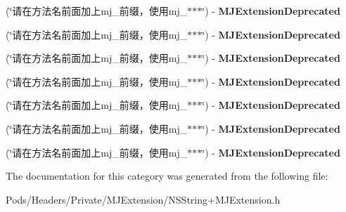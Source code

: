 \begin{DoxyCompactItemize}
(\char`\"{}请在方法名前面加上mj\+\_\+前缀，使用mj\+\_\+$\ast$$\ast$$\ast$\char`\"{}) -\/ {\bfseries M\+J\+Extension\+Deprecated}
\item 
\mbox{\label{category_n_s_string_07_m_j_extension_deprecated__v__2__5__16_08_ab08e53dd4b8481f26934085e7ff40d45}} 
(\char`\"{}请在方法名前面加上mj\+\_\+前缀，使用mj\+\_\+$\ast$$\ast$$\ast$\char`\"{}) -\/ {\bfseries M\+J\+Extension\+Deprecated}
\item 
\mbox{\label{category_n_s_string_07_m_j_extension_deprecated__v__2__5__16_08_ab08e53dd4b8481f26934085e7ff40d45}} 
(\char`\"{}请在方法名前面加上mj\+\_\+前缀，使用mj\+\_\+$\ast$$\ast$$\ast$\char`\"{}) -\/ {\bfseries M\+J\+Extension\+Deprecated}
\item 
\mbox{\label{category_n_s_string_07_m_j_extension_deprecated__v__2__5__16_08_ab08e53dd4b8481f26934085e7ff40d45}} 
(\char`\"{}请在方法名前面加上mj\+\_\+前缀，使用mj\+\_\+$\ast$$\ast$$\ast$\char`\"{}) -\/ {\bfseries M\+J\+Extension\+Deprecated}
\item 
\mbox{\label{category_n_s_string_07_m_j_extension_deprecated__v__2__5__16_08_ab08e53dd4b8481f26934085e7ff40d45}} 
(\char`\"{}请在方法名前面加上mj\+\_\+前缀，使用mj\+\_\+$\ast$$\ast$$\ast$\char`\"{}) -\/ {\bfseries M\+J\+Extension\+Deprecated}
\item 
\mbox{\label{category_n_s_string_07_m_j_extension_deprecated__v__2__5__16_08_ab08e53dd4b8481f26934085e7ff40d45}} 
(\char`\"{}请在方法名前面加上mj\+\_\+前缀，使用mj\+\_\+$\ast$$\ast$$\ast$\char`\"{}) -\/ {\bfseries M\+J\+Extension\+Deprecated}
\item 
\mbox{\label{category_n_s_string_07_m_j_extension_deprecated__v__2__5__16_08_ab08e53dd4b8481f26934085e7ff40d45}} 
(\char`\"{}请在方法名前面加上mj\+\_\+前缀，使用mj\+\_\+$\ast$$\ast$$\ast$\char`\"{}) -\/ {\bfseries M\+J\+Extension\+Deprecated}
\end{DoxyCompactItemize}


The documentation for this category was generated from the following file\+:\begin{DoxyCompactItemize}
\item 
Pods/\+Headers/\+Private/\+M\+J\+Extension/N\+S\+String+\+M\+J\+Extension.\+h\end{DoxyCompactItemize}
